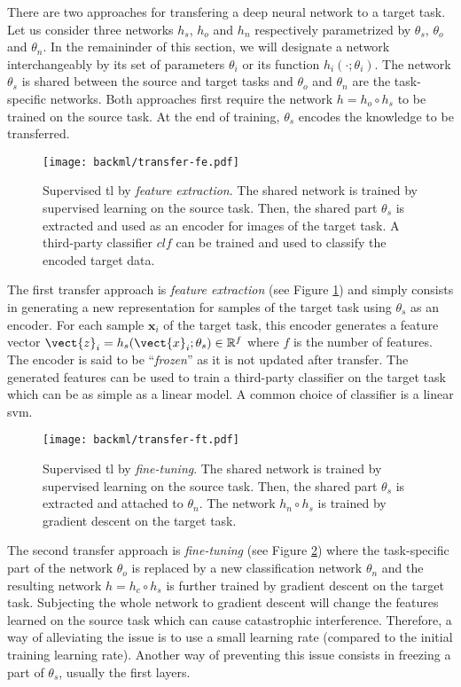 There are two approaches for transfering a deep neural network to a target task.
Let us consider three networks $h_s$, $h_o$ and $h_n$ respectively parametrized
by $\theta_s$, $\theta_o$ and $\theta_n$. In the remaininder of this section, we
will designate a network interchangeably by its set of parameters $\theta_i$ or
its function $h_i(\cdot;\theta_i)$. The network $\theta_s$ is shared between the
source and target tasks and $\theta_o$ and $\theta_n$ are the task-specific
networks. Both approaches first require the network $h = h_o \circ h_s$ to be
trained on the source task. At the end of training, $\theta_s$ encodes the knowledge
to be transferred.

\begin{figure}
  \centering
  \texttt{[image: backml/transfer-fe.pdf]}
  \caption{Supervised \acrlong{tl} by \textit{feature extraction}. The shared network is trained by supervised learning on the source task. Then, the shared part $\theta_s$ is extracted and used as an encoder for images of the target task. A third-party classifier $clf$ can be trained and used to classify the encoded target data.}
  \label{fig:backml:transfer-fe}
\end{figure}

The first transfer approach is \textit{feature extraction} (see Figure
\ref{fig:backml:transfer-fe}) and simply consists in generating a new representation
for samples of the target task using $\theta_s$ as an encoder. For each sample
$\mathbf{x}_i$ of the target task, this encoder generates a feature vector
$\vect{z}_i = h_s(\vect{x}_i;\theta_s) \in \mathbb{R}^f$ where $f$ is the number
of features. The encoder is said to be ``\textit{frozen}'' as it is not updated
after transfer. The generated features can be used to train a third-party classifier
on the target task which can be as simple as a linear model. A common choice of
classifier is a linear \acrshort{svm}.

\begin{figure}
  \centering
  \texttt{[image: backml/transfer-ft.pdf]}
  \caption{Supervised \acrlong{tl} by \textit{fine-tuning}. The shared network is trained by supervised learning on the source task. Then, the shared part $\theta_s$ is extracted and attached to $\theta_n$. The network $h_n \circ h_s$ is trained by gradient descent on the target task.}
  \label{fig:backml:transfer-ft}
\end{figure}

The second transfer approach is \textit{fine-tuning} (see Figure \ref{fig:backml:transfer-ft})
where the task-specific part of the network $\theta_{o}$ is replaced by a new
classification network $\theta_{n}$ and the resulting network $h = h_c \circ h_s$
is further trained by gradient descent on the target task. Subjecting the whole
network to gradient descent will change the features learned on the source task
which can cause catastrophic interference. Therefore, a way of alleviating the
issue is to use a small learning rate (compared to the initial training learning
rate). Another way of preventing this issue consists in freezing a part of
$\theta_s$, usually the first layers.

